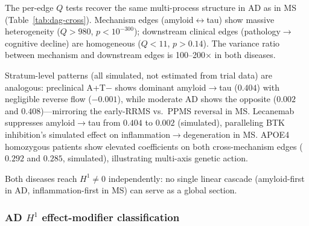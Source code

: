 \documentclass{article}
\begin{document}
The per-edge $Q$ tests recover the same multi-process structure in AD as in MS (Table~\ref{tab:dag-cross}).
Mechanism edges (amyloid$\leftrightarrow$tau) show massive heterogeneity ($Q > 980$, $p < 10^{-300}$); downstream clinical edges (pathology$\to$cognitive decline) are homogeneous ($Q < 11$, $p > 0.14$).
The variance ratio between mechanism and downstream edges is 100--200$\times$ in both diseases.

Stratum-level patterns (all simulated, not estimated from trial data) are analogous: preclinical A+T$-$ shows dominant amyloid$\to$tau ($0.404$) with negligible reverse flow ($-0.001$), while moderate AD shows the opposite ($0.002$ and $0.408$)---mirroring the early-RRMS vs.\ PPMS reversal in MS.
Lecanemab suppresses amyloid$\to$tau from $0.404$ to $0.002$ (simulated), paralleling BTK inhibition's simulated effect on inflammation$\to$degeneration in MS.
APOE4 homozygous patients show elevated coefficients on both cross-mechanism edges ($0.292$ and $0.285$, simulated), illustrating multi-axis genetic action.

Both diseases reach $H^1 \neq 0$ independently: no single linear cascade (amyloid-first in AD, inflammation-first in MS) can serve as a global section.

\subsubsection{AD $H^1$ effect-modifier classification}
\end{document}
